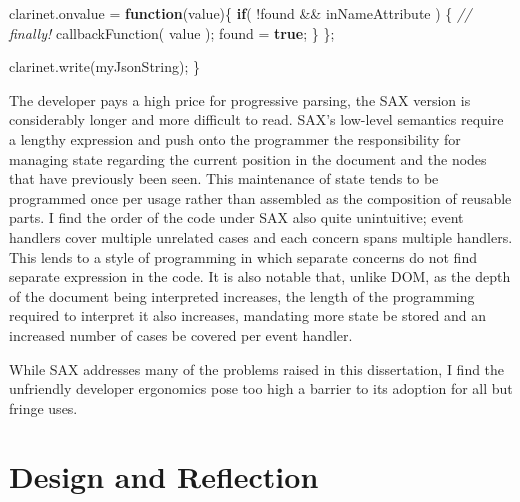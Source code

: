 \documentclass[12pt, ]{article}
\let\stdsection\section
\renewcommand\section{\newpage\stdsection}
\newenvironment{Shaded}{}{}
\newcommand{\KeywordTok}[1]{\textcolor[rgb]{0.00,0.44,0.13}{\textbf{{#1}}}}
\newcommand{\CommentTok}[1]{\textcolor[rgb]{0.38,0.63,0.69}{\textit{{#1}}}}
\newcommand{\OtherTok}[1]{\textcolor[rgb]{0.00,0.44,0.13}{{#1}}}
\newcommand{\FunctionTok}[1]{\textcolor[rgb]{0.02,0.16,0.49}{{#1}}}
\newcommand{\NormalTok}[1]{{#1}}
\begin{document}
\begin{Shaded}
\begin{Highlighting}[]
   \OtherTok{clarinet}\NormalTok{.}\FunctionTok{onvalue} \NormalTok{= }\KeywordTok{function}\NormalTok{(value)\{}
      \KeywordTok{if}\NormalTok{( !found && inNameAttribute ) \{}
         \CommentTok{// finally!}
         \FunctionTok{callbackFunction}\NormalTok{( value );}
         \NormalTok{found = }\KeywordTok{true}\NormalTok{;}
      \NormalTok{\}}
   \NormalTok{\};      }
   
   \OtherTok{clarinet}\NormalTok{.}\FunctionTok{write}\NormalTok{(myJsonString);   }
\NormalTok{\}}
\end{Highlighting}
\end{Shaded}

The developer pays a high price for progressive parsing, the SAX version
is considerably longer and more difficult to read. SAX's low-level
semantics require a lengthy expression and push onto the programmer the
responsibility for managing state regarding the current position in the
document and the nodes that have previously been seen. This maintenance
of state tends to be programmed once per usage rather than assembled as
the composition of reusable parts. I find the order of the code under
SAX also quite unintuitive; event handlers cover multiple unrelated
cases and each concern spans multiple handlers. This lends to a style of
programming in which separate concerns do not find separate expression
in the code. It is also notable that, unlike DOM, as the depth of the
document being interpreted increases, the length of the programming
required to interpret it also increases, mandating more state be stored
and an increased number of cases be covered per event handler.

While SAX addresses many of the problems raised in this dissertation, I
find the unfriendly developer ergonomics pose too high a barrier to its
adoption for all but fringe uses.

\section{Design and Reflection}\label{design-and-reflection}
\end{document}
